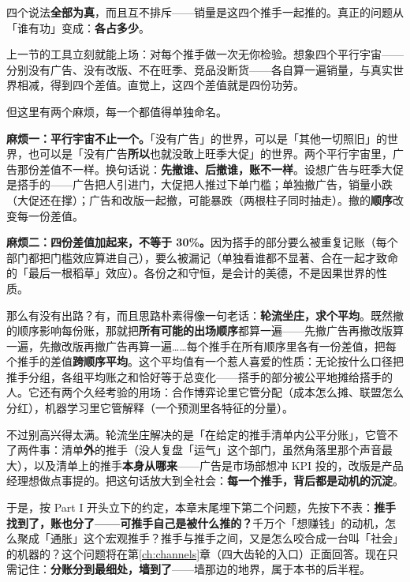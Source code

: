 \documentclass[../../main2.tex]{subfiles}
\begin{document}
	四个说法\textbf{全部为真}，而且互不排斥——销量是这四个推手一起推的。真正的问题从「谁有功」变成：\textbf{各占多少}。

	上一节的工具立刻就能上场：对每个推手做一次无你检验。想象四个平行宇宙——分别没有广告、没有改版、不在旺季、竞品没断货——各自算一遍销量，与真实世界相减，得到四个差值。直觉上，这四个差值就是四份功劳。

	但这里有两个麻烦，每一个都值得单独命名。

	\textbf{麻烦一：平行宇宙不止一个。}「没有广告」的世界，可以是「其他一切照旧」的世界，也可以是「没有广告\textbf{所以}也就没敢上旺季大促」的世界。两个平行宇宙里，广告那份差值不一样。换句话说：\textbf{先撤谁、后撤谁，账不一样}。设想广告与旺季大促是搭手的——广告把人引进门，大促把人推过下单门槛；单独撤广告，销量小跌（大促还在撑）；广告和改版一起撤，可能暴跌（两根柱子同时抽走）。撤的\textbf{顺序}改变每一份差值。

	\textbf{麻烦二：四份差值加起来，不等于 30\%。}因为搭手的部分要么被重复记账（每个部门都把门槛效应算进自己），要么被漏记（单独看谁都不显著、合在一起才致命的「最后一根稻草」效应）。各份之和守恒，是会计的美德，不是因果世界的性质。

	那么有没有出路？有，而且思路朴素得像一句老话：\textbf{轮流坐庄，求个平均}。既然撤的顺序影响每份账，那就把\textbf{所有可能的出场顺序}都算一遍——先撤广告再撤改版算一遍，先撤改版再撤广告再算一遍……每个推手在所有顺序里各有一份差值，把每个推手的差值\textbf{跨顺序平均}。这个平均值有一个惹人喜爱的性质：无论按什么口径把推手分组，各组平均账之和恰好等于总变化——搭手的部分被公平地摊给搭手的人。它还有两个久经考验的用场：合作博弈论里它管分配（成本怎么摊、联盟怎么分红），机器学习里它管解释（一个预测里各特征的分量）。

	不过别高兴得太满。轮流坐庄解决的是「在给定的推手清单内公平分账」，它管不了两件事：清单\textbf{外}的推手（没人复盘「运气」这个部门，虽然角落里那个声音最大），以及清单上的推手\textbf{本身从哪来}——广告是市场部想冲 KPI 投的，改版是产品经理想做点事提的。把这句话放大到全社会：\textbf{每一个推手，背后都是动机的沉淀}。

	于是，按 Part I 开头立下的约定，本章末尾埋下第二个问题，先按下不表：\textbf{推手找到了，账也分了——可推手自己是被什么推的？}千万个「想赚钱」的动机，怎么聚成「通胀」这个宏观推手？推手与推手之间，又是怎么咬合成一台叫「社会」的机器的？这个问题将在第\ref{ch:channels}章（四大齿轮的入口）正面回答。现在只需记住：\textbf{分账分到最细处，墙到了}——墙那边的地界，属于本书的后半程。
\end{document}
